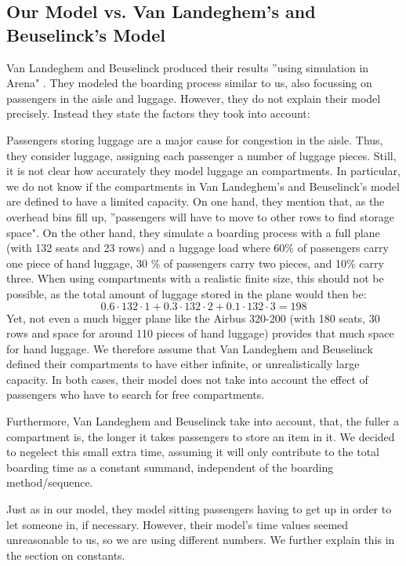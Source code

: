 \documentclass[11pt]{article}
\begin{document}
\subsection{Our Model vs. Van Landeghem's and Beuselinck's Model} 

Van Landeghem and Beuselinck produced their results ''using simulation in Arena" \cite{beus}. They modeled the boarding process similar to us, also focussing on passengers in the aisle and luggage. However, they do not explain their model precisely. Instead they state the factors they took into account:


Passengers storing luggage are a major cause for congestion in the aisle. Thus, they consider luggage, assigning each passenger a number of luggage pieces. Still, it is not clear how accurately they model luggage an compartments. In particular, we do not know if the compartments in Van Landeghem's and Beuselinck's model are defined to have a limited capacity. On one hand, they mention that, as the overhead bins fill up, ''passengers will have to move to other rows to find storage space"\cite{beus}. On the other hand, they simulate a boarding process with a full plane (with 132 seats and 23 rows) and a luggage load where 60\% of passengers carry one piece of hand luggage, 30 \% of passengers carry two pieces, and 10\% carry three. When using compartments with a realistic finite size, this should not be possible, as the total amount of luggage stored in the plane would then be:
$$ 0.6 \cdot 132 \cdot 1+ 0.3 \cdot 132 \cdot 2 + 0.1 \cdot 132 \cdot 3 = 198$$
Yet, not even a much bigger plane like the Airbus 320-200 (with 180 seats, 30 rows and space for around 110 pieces of hand luggage) provides that much space for hand luggage. We therefore assume that Van Landeghem and Beuselinck defined their compartments to have either infinite, or unrealistically large capacity. In both cases, their model does not take into account the effect of passengers who have to search for free compartments.


Furthermore, Van Landeghem and Beuselinck take into account, that, the fuller a compartment is, the longer it takes passengers to store an item in it. We decided to negelect this small extra time, assuming it will only contribute to the total boarding time as a constant summand, independent of the boarding method/sequence.


Just as in our model, they model sitting passengers having to get up in order to let someone in, if necessary. However, their model's  time values seemed unreasonable to us, so we are using different numbers. We further explain this in the section on constants.
\end{document}
